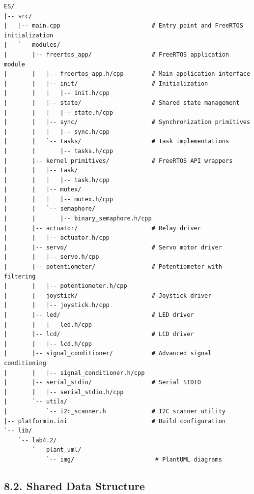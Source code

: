 \documentclass[12pt]{article}
\begin{document}
\begin{verbatim}
ES/
|-- src/
|   |-- main.cpp                          # Entry point and FreeRTOS initialization
|   `-- modules/
|       |-- freertos_app/                 # FreeRTOS application module
|       |   |-- freertos_app.h/cpp        # Main application interface
|       |   |-- init/                     # Initialization
|       |   |   |-- init.h/cpp
|       |   |-- state/                    # Shared state management
|       |   |   |-- state.h/cpp
|       |   |-- sync/                     # Synchronization primitives
|       |   |   |-- sync.h/cpp
|       |   `-- tasks/                    # Task implementations
|       |       |-- tasks.h/cpp
|       |-- kernel_primitives/            # FreeRTOS API wrappers
|       |   |-- task/
|       |   |   |-- task.h/cpp
|       |   |-- mutex/
|       |   |   |-- mutex.h/cpp
|       |   `-- semaphore/
|       |       |-- binary_semaphore.h/cpp
|       |-- actuator/                     # Relay driver
|       |   |-- actuator.h/cpp
|       |-- servo/                        # Servo motor driver
|       |   |-- servo.h/cpp
|       |-- potentiometer/                # Potentiometer with filtering
|       |   |-- potentiometer.h/cpp
|       |-- joystick/                     # Joystick driver
|       |   |-- joystick.h/cpp
|       |-- led/                          # LED driver
|       |   |-- led.h/cpp
|       |-- lcd/                          # LCD driver
|       |   |-- lcd.h/cpp
|       |-- signal_conditioner/           # Advanced signal conditioning
|       |   |-- signal_conditioner.h/cpp
|       |-- serial_stdio/                 # Serial STDIO
|       |   |-- serial_stdio.h/cpp
|       `-- utils/
|           `-- i2c_scanner.h             # I2C scanner utility
|-- platformio.ini                        # Build configuration
`-- lib/
    `-- lab4.2/
        `-- plant_uml/
            `-- img/                       # PlantUML diagrams
\end{verbatim}

\subsection*{8.2. Shared Data Structure}
\end{document}
